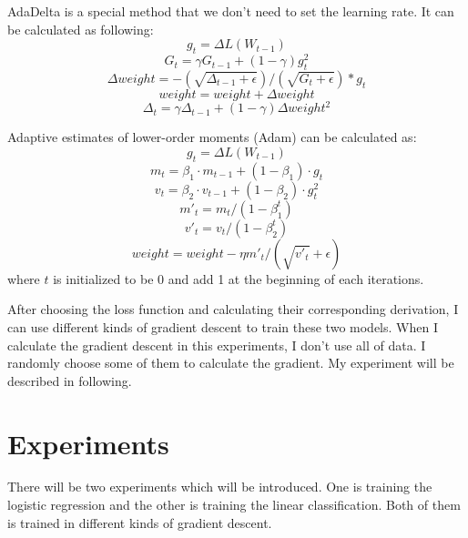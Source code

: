 \documentclass[journal, a4paper]{IEEEtran}
\begin{document}
AdaDelta is a special method that we don't need to set the learning rate. It can be calculated as following:
\begin{equation}
g_t=\Delta L(W_{t-1}) \label{eq18}
\end{equation}
\begin{equation}
G_t = \gamma G_{t-1} + (1-\gamma)g_t^2 \label{eq19}
\end{equation}
\begin{equation}
\Delta weight = -(\sqrt{\Delta_{t-1} + \epsilon}) / (\sqrt{G_{t} + \epsilon}) * g_t \label{eq20}
\end{equation}
\begin{equation}
weight = weight + \Delta weight \label{eq21}
\end{equation}
\begin{equation}
\Delta_{t}=\gamma \Delta_{t-1} + (1-\gamma)\Delta weight^2 \label{eq22}
\end{equation}

Adaptive estimates of lower-order moments (Adam) can be calculated as:
\begin{equation}
g_t=\Delta L(W_{t-1}) \label{eq23}
\end{equation}
\begin{equation}
m_t=\beta_1 \cdot m_{t-1} + (1-\beta_1) \cdot g_t \label{eq24}
\end{equation}
\begin{equation}
v_t=\beta_2 \cdot v_{t-1} + (1-\beta_2) \cdot g_t^2 \label{eq25}
\end{equation}
\begin{equation}
m'_t=m_t/(1-\beta_1^t) \label{eq26}
\end{equation}
\begin{equation}
v'_t=v_t/(1-\beta_2^t) \label{eq27}
\end{equation}
\begin{equation}
weight = weight - \eta m'_t / (\sqrt{v'_t}+\epsilon)
\end{equation}
where $t$ is initialized to be 0 and add 1 at the beginning of each iterations.

After choosing the loss function and calculating their corresponding derivation, I can use different kinds of gradient descent to train these two models. When I calculate the gradient descent in this experiments, I don't use all of data. I randomly choose some of them to calculate the gradient. My experiment will be described in following.

\section{Experiments}
There will be two experiments which will be introduced. One is training the logistic regression and the other is training the linear classification. Both of them is trained in different kinds of gradient descent.
\end{document}

